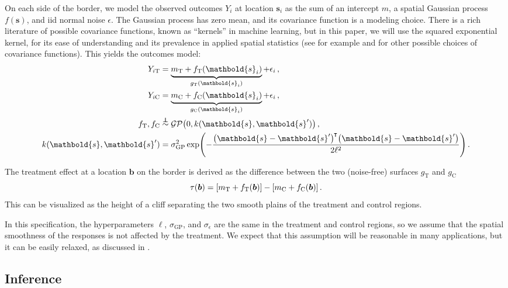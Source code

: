 \documentclass[letter,12pt]{article}
\DeclarePairedDelimiter{\parenthesis}{\lparen}{\rparen}
\DeclarePairedDelimiter{\squarebracket}{\lbrack}{\rbrack}
\newcommand{\del}[1]{\parenthesis*{#1}}
\newcommand{\sbr}[1]{\squarebracket*{#1}}
\DeclareMathOperator{\GP}{\mathcal{GP}}
\newcommand*{\trans}{^{\mkern-1.5mu\intercal}}
\newcommand{\treat}{\mathrm{T}}
\newcommand{\ctrol}{\mathrm{C}}
\newcommand{\sigmaf}{\sigma_{\mathrm{GP}}}
\newcommand{\sigman}{\sigma_{\epsilon}}
\newcommand{\svec}{\mathbold{s}}
\newcommand{\indep}{\protect\mathpalette{\protect\independenT}{\perp}}
\def\independenT#1#2{\mathrel{\rlap{$#1#2$}\mkern2mu{#1#2}}}
\newcommand{\sentinel}{\bm{b}}
\newcommand{\eqlabel}[1]{\label{#1}}
\begin{document}
On each side of the border, we model the observed outcomes \(Y_i\) at location \(\svec_i\) as the sum of an intercept \(m\), a spatial Gaussian process \(f(\svec)\), and iid normal noise \(\epsilon\).
The Gaussian process has zero mean, and its covariance function is a modeling choice.
There is a rich literature of possible covariance functions, known as ``kernels'' in machine learning, but in this paper, we will use the squared exponential kernel, for its ease of understanding and its prevalence in applied spatial statistics
(see for example \cite{banerjee2014hierarchical} and \cite{rasmussen2006gaussian} for other possible choices of covariance functions).
This yields the outcomes model:
\begin{equation}
    \begin{split}
        Y_{i\treat} &= \underbrace{m_\treat{} + f_\treat{}(\svec_i)}_{g_\treat{}(\svec_i)} + \epsilon_i \,, \\
        Y_{i\ctrol} &= \underbrace{m_\ctrol{} + f_\ctrol{}(\svec_i)}_{g_\ctrol{}(\svec_i)} + \epsilon_i \,, \\
        f_\treat{}, f_\ctrol{} &\overset{\indep}{\sim} \GP\del{0, k(\svec, \svec')} \,, \\
        k(\svec,\svec') &= \sigmaf^2 \exp\del{ - \frac{\del{\svec-\svec'}\trans\del{\svec-\svec'}}{2 \ell^2}} \,.
    \end{split}
    \eqlabel{eq:spec2gp}
\end{equation}



The treatment effect at a location \(\sentinel\) on the border is derived as the difference between the two (noise-free) surfaces \(g_\treat{}\) and \(g_\ctrol{}\)
\begin{equation}
    \tau(\sentinel) = \sbr{m_\treat{} + f_\treat{}(\sentinel)} - \sbr{m_\ctrol{} + f_\ctrol{}(\sentinel)}\,.
\end{equation}
This can be visualized as the height of a cliff separating the two smooth plains of the treatment and control regions.

In this specification, the hyperparameters \(\ell\), \(\sigmaf\), and \(\sigman\) are the same in the treatment and control regions, so we assume that the spatial smoothness of the responses is not affected by the treatment.
We expect that this assumption will be reasonable in many applications, but it can be easily relaxed, as discussed in \cite{Branson:2017qy}.



\hypertarget{inference}{%
\subsection{Inference}\label{inference}}
\end{document}
